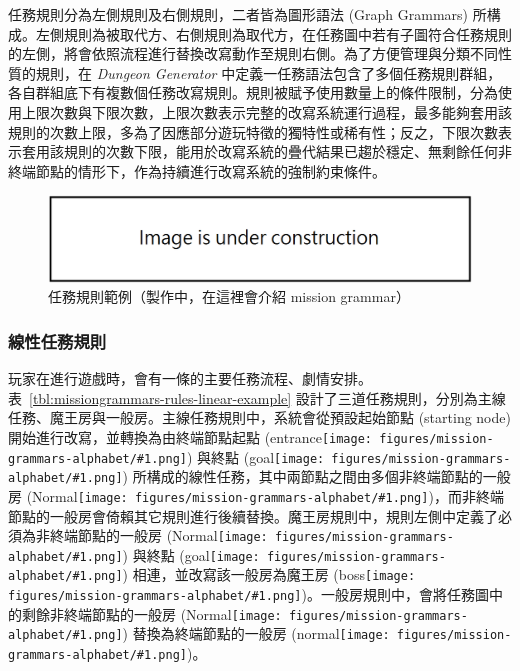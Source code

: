 \newcommand{\alphabetnode}[1]{{\texttt{[image: figures/mission-grammars-alphabet/\#1.png]}}}

任務規則分為左側規則及右側規則，二者皆為圖形語法 (Graph Grammars) 所構成。左側規則為被取代方、右側規則為取代方，在任務圖中若有子圖符合任務規則的左側，將會依照流程進行替換改寫動作至規則右側。為了方便管理與分類不同性質的規則，在 \textit{Dungeon Generator} 中定義一任務語法包含了多個任務規則群組，各自群組底下有複數個任務改寫規則。規則被賦予使用數量上的條件限制，分為使用上限次數與下限次數，上限次數表示完整的改寫系統運行過程，最多能夠套用該規則的次數上限，多為了因應部分遊玩特徵的獨特性或稀有性；反之，下限次數表示套用該規則的次數下限，能用於改寫系統的疊代結果已趨於穩定、無剩餘任何非終端節點的情形下，作為持續進行改寫系統的強制約束條件。

\begin{figure}[!htb]
  \begin{center}
    \includegraphics[width=1.0\textwidth]{figures/under_construction.png}
    \caption{任務規則範例（製作中，在這裡會介紹 mission grammar）}
    \label{fig:missiongrammars-tutorial}
  \end{center}
\end{figure}

\subsubsection{線性任務規則}
\label{sssec:method-missiongrammars-rules-linearrules}

玩家在進行遊戲時，會有一條的主要任務流程、劇情安排。表~\ref{tbl:missiongrammars-rules-linear-example} 設計了三道任務規則，分別為主線任務、魔王房與一般房。主線任務規則中，系統會從預設起始節點 (starting node) 開始進行改寫，並轉換為由終端節點起點 (entrance\alphabetnode{t-entrance}) 與終點 (goal\alphabetnode{t-goal}) 所構成的線性任務，其中兩節點之間由多個非終端節點的一般房 (Normal\alphabetnode{nt-normal})，而非終端節點的一般房會倚賴其它規則進行後續替換。魔王房規則中，規則左側中定義了必須為非終端節點的一般房 (Normal\alphabetnode{nt-normal}) 與終點 (goal\alphabetnode{t-goal}) 相連，並改寫該一般房為魔王房 (boss\alphabetnode{t-boss})。一般房規則中，會將任務圖中的剩餘非終端節點的一般房 (Normal\alphabetnode{nt-normal}) 替換為終端節點的一般房 (normal\alphabetnode{t-normal})。


